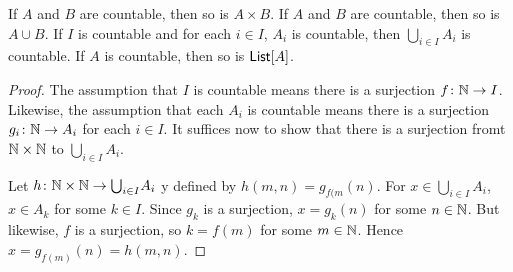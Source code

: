 \begin{lemma}
	If $A$ and $B$ are countable, then so is $A\times B$.
	If $A$ and $B$ are countable, then so is $A\cup B$.
	If $I$ is countable and for each $i\in I$, $A_i$ is countable, then $\bigcup_{i\in I}A_i$ is countable.
	If $A$ is countable, then so is $\mathord{\textsf{List}}[A]$.
	
	\begin{proof}
		The assumption that $I$ is countable means there is a surjection ${f}\colon{\mathbb N}\to{I}$. Likewise, the assumption that each $A_i$ is countable means there is a surjection ${g_i}\colon{\mathbb N}\to{A_i}$ for each $i\in I$. It suffices now to show that there is a surjection fromt $\mathbb N\times \mathbb N$ to $\bigcup_{i\in I}A_i$.
		
		Let ${h}\colon{\mathbb N\times \mathbb N}\to{\bigcup}_{i\in I}A_i$ y defined by $h(m,n) = g_{f(m}(n)$. For $x\in \bigcup_{i\in I}A_i$, $x\in  A_k$ for some $k\in I$. Since $g_k$ is a surjection, $x = g_k(n)$ for some $n\in\mathbb N$. 
		But likewise, $f$ is a surjection, so $k = f(m)$ for some $m\in\mathbb N$. 
		Hence $x = g_{f(m)}(n) = h(m,n)$.
	\end{proof}
\end{lemma}

